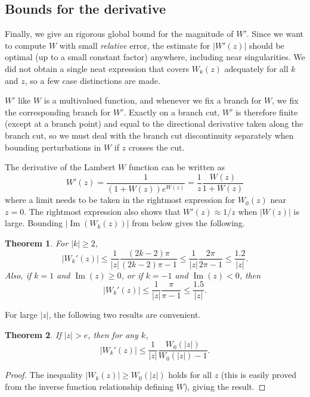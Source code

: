 \documentclass[11pt,a4paper]{article}
\newtheorem{theorem}{Theorem}
\begin{document}
\subsection{Bounds for the derivative}

Finally, we give an rigorous global bound for the
magnitude of $W'$.
Since we want to compute $W$ with small \emph{relative} error,
the estimate for $|W'(z)|$
should be optimal (up to a small constant factor) anywhere,
including near singularities.
We did not obtain a single neat expression that covers $W_k(z)$ adequately
for all $k$ and $z$, so a few case distinctions are made.

$W'$ like $W$ is a multivalued function,
and whenever we fix a branch for $W$, we
fix the corresponding branch for $W'$. Exactly on a branch cut, $W'$ is therefore
finite (except at a branch point) and equal
to the directional derivative taken along the branch cut,
so we must deal with the branch cut discontinuity separately when
bounding perturbations in $W$ if $z$ crosses the cut.

The derivative of the Lambert $W$ function can be written as
$$W'(z) = \frac{1}{(1+W(z)) e^{W(z)}} = \frac{1}{z} \frac{W(z)}{1 + W(z)}$$
where a limit needs to be taken in the rightmost expression for $W_0(z)$
near $z = 0$.
The rightmost expression also shows that $W'(z) \approx 1/z$ when $|W(z)|$ is large.
Bounding $|\operatorname{Im}(W_k(z))|$ from below gives the
following.

\begin{theorem}
For $|k| \ge 2$,
$$|W_k'(z)| \le \frac{1}{|z|} \frac{(2k-2)\pi}{(2k-2)\pi-1} \le \frac{1}{|z|} \frac{2\pi}{2\pi-1} \le \frac{1.2}{|z|}.$$
Also, if $k = 1$ and $\operatorname{Im}(z) \ge 0$, or if $k = -1$ and $\operatorname{Im}(z) < 0$, then
$$|W_k'(z)| \le \frac{1}{|z|} \frac{\pi}{\pi-1} \le \frac{1.5}{|z|}.$$
\end{theorem}

For large $|z|$, the following two results are convenient.

\begin{theorem}If $|z| > e$, then for any $k$,
$$|W_k'(z)| \le \frac{1}{|z|} \frac{W_0(|z|)}{W_0(|z|)-1}.$$
\end{theorem}

\begin{proof}
The inequality $|W_k(z)| \ge W_0(|z|)$ holds for all $z$ (this is easily proved from the
inverse function relationship defining $W$), giving the result.
\end{proof}
\end{document}

